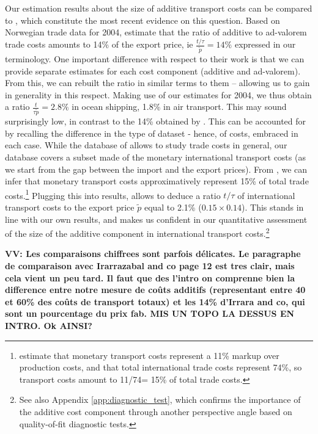 \documentclass[a4paper,11pt]{article}
\begin{document}
Our estimation results about the size of additive transport costs can be compared to \citet{Irrazabal_2015}, which constitute the most recent evidence on this question. Based on Norwegian trade data for 2004, \citet{Irrazabal_2015} estimate that the ratio of additive to ad-valorem trade costs amounts to 14\% of the export price, ie $\frac{t/\tau}{\widetilde{p}}=14\%$ expressed in our terminology. One important difference with respect to their work is that we can provide separate estimates for each cost component (additive and ad-valorem). From this, we can rebuilt the ratio in similar terms to them -- allowing us to gain in generality in this respect. Making use of our estimates for 2004, we thus obtain a ratio $\frac{t}{\tau\widetilde{p}}=2.8\%$ in ocean shipping, 1.8\% in air transport. This may sound surprisingly low, in contrast to the 14\% obtained by \citet{Irrazabal_2015}. This can be accounted for by recalling the difference in the type of dataset - hence, of costs, embraced in each case. While the database of \citet{Irrazabal_2015} allows to study trade costs in general, our database covers a subset made of the monetary international transport costs (as we start from the gap between the import and the export prices). From \citet{anderson_wincoop_jel}, we can infer that monetary transport costs approximatively represent 15\% of total trade costs.\footnote{\citet{anderson_wincoop_jel} estimate that monetary transport costs represent a 11\% markup over production costs, and that total international trade costs represent 74\%, so transport costs amount to 11/74= 15\% of total trade costs.} Plugging this into \citet{Irrazabal_2015} results, allows to deduce a ratio $t/\tau$ of international transport costs to the export price $\widetilde{p}$ equal to 2.1\% ($0.15\times 0.14$). This stands in line with our own results, and makes us confident in our quantitative assessment of the size of the additive component in international transport costs.\footnote{See also Appendix \ref{app:diagnostic_test}, which confirms the importance of the additive cost component through another perspective angle based on quality-of-fit diagnostic tests.}\smallskip

\textbf{VV: Les comparaisons chiffrees sont parfois délicates. Le paragraphe de comparaison avec Irarrazabal and co page 12 est tres clair, mais cela vient un peu tard. Il faut que des l’intro on comprenne bien la difference entre notre mesure de coûts additifs (representant entre 40 et 60\% des coûts de transport totaux) et les 14\% d’Irrara and co, qui sont un pourcentage du prix fab. MIS UN TOPO LA DESSUS EN INTRO. Ok AINSI?}
\end{document}
